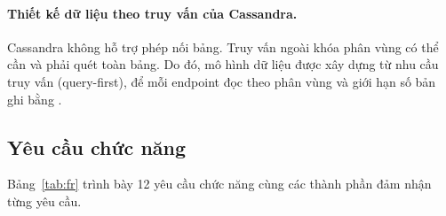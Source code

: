 \paragraph{Thiết kế dữ liệu theo truy vấn của Cassandra.} Cassandra không hỗ trợ phép nối bảng. Truy vấn ngoài khóa phân vùng có thể cần  và phải quét toàn bảng. Do đó, mô hình dữ liệu được xây dựng từ nhu cầu truy vấn (query-first), để mỗi endpoint đọc theo phân vùng và giới hạn số bản ghi bằng .

\subsection{Yêu cầu chức năng}

Bảng~\ref{tab:fr} trình bày 12 yêu cầu chức năng cùng các thành phần đảm nhận từng yêu cầu.

